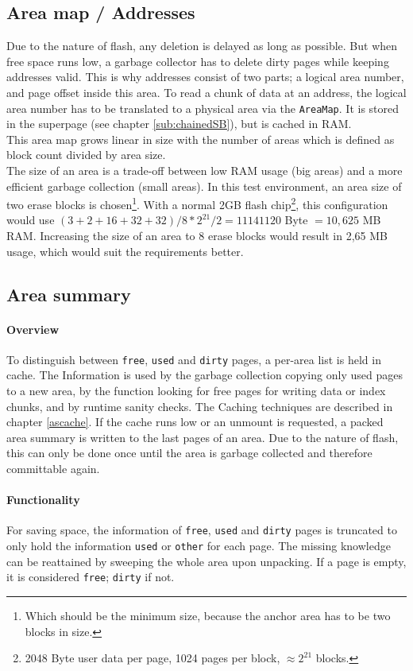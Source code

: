 \subsection{Area map / Addresses}
Due to the nature of flash, any deletion is delayed as long as possible. But when free space runs low, a garbage collector has to delete dirty pages while keeping addresses valid. This is why addresses consist of two parts; a logical area number, and page offset inside this area. To read a chunk of data at an address, the logical area number has to be translated to a physical area via the \texttt{AreaMap}. It is stored in the superpage (see chapter \ref{sub:chainedSB}), but is cached in RAM.\\
This area map grows linear in size with the number of areas which is defined as block count divided by area size.\\
The size of an area is a trade-off between low RAM usage (big areas) and a more efficient garbage collection (small areas). In this test environment, an area size of two erase blocks is chosen\footnote{Which should be the minimum size, because the anchor area has to be two blocks in size.}. With a normal 2GB flash chip\footnote{2048 Byte user data per page, 1024 pages per block, $\approx 2^21$ blocks.}, this configuration would use $(3+2+16+32+32) / 8 * 2^{21} / 2 = 11141120$ Byte $= 10,625$ MB RAM. Increasing the size of an area to 8 erase blocks would result in 2,65 MB usage, which would suit the requirements better.

\subsection{Area summary}
\paragraph{Overview}
\label{summary}
To distinguish between \texttt{free}, \texttt{used} and \texttt{dirty} pages, a per-area list is held in cache. The Information is used by the garbage collection copying only used pages to a new area, by the function looking for free pages for writing data or index chunks, and by runtime sanity checks. The Caching techniques are described in chapter \ref{ascache}. If the cache runs low or an unmount is requested, a packed area summary is written to the last pages of an area. Due to the nature of flash, this can only be done once until the area is garbage collected and therefore committable again.
\paragraph{Functionality}
For saving space, the information of \texttt{free}, \texttt{used} and \texttt{dirty} pages is truncated to only hold the information \texttt{used} or \texttt{other} for each page. The missing knowledge can be reattained by sweeping the whole area upon unpacking. If a page is empty, it is considered \texttt{free}; \texttt{dirty} if not.

